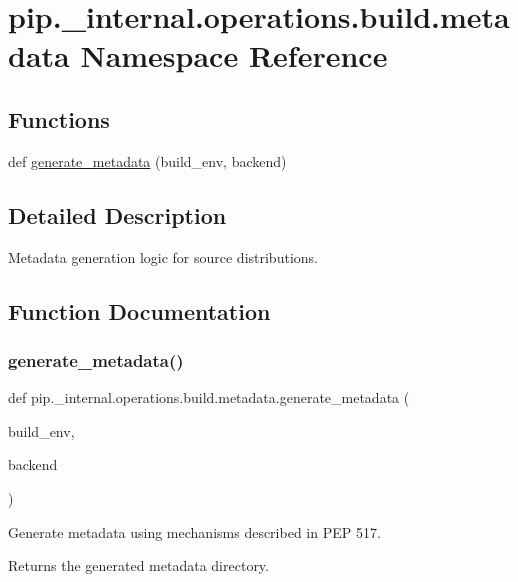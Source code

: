 \hypertarget{namespacepip_1_1__internal_1_1operations_1_1build_1_1metadata}{}\section{pip.\+\_\+internal.\+operations.\+build.\+metadata Namespace Reference}
\label{namespacepip_1_1__internal_1_1operations_1_1build_1_1metadata}
\subsection*{Functions}
\begin{DoxyCompactItemize}
\item 
def \hyperlink{namespacepip_1_1__internal_1_1operations_1_1build_1_1metadata_a3388c99226b5ae6f41077edcd9ec4732}{generate\+\_\+metadata} (build\+\_\+env, backend)
\end{DoxyCompactItemize}


\subsection{Detailed Description}
\begin{DoxyVerb}Metadata generation logic for source distributions.
\end{DoxyVerb}
 

\subsection{Function Documentation}
\mbox{\label{namespacepip_1_1__internal_1_1operations_1_1build_1_1metadata_a3388c99226b5ae6f41077edcd9ec4732}} 
\subsubsection{\texorpdfstring{generate\+\_\+metadata()}{generate\_metadata()}}
{\footnotesize\ttfamily def pip.\+\_\+internal.\+operations.\+build.\+metadata.\+generate\+\_\+metadata (\begin{DoxyParamCaption}\item[{}]{build\+\_\+env,  }\item[{}]{backend }\end{DoxyParamCaption})}

\begin{DoxyVerb}Generate metadata using mechanisms described in PEP 517.

Returns the generated metadata directory.
\end{DoxyVerb}
 